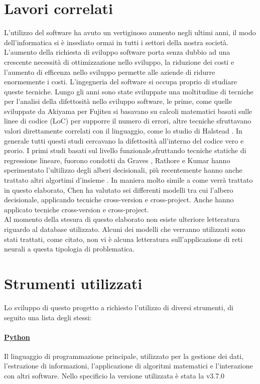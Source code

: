 \documentclass[%
    corpo=12pt,
    twoside,
    oldstyle,
    autoretitolo,
    greek,
    evenboxes,
]{toptesi}
\begin{document}
\section{Lavori correlati}
L'utilizzo del software ha avuto un vertiginoso aumento negli ultimi anni, il modo dell'informatica si è insediato ormai in tutti i settori della nostra società. L'aumento della richiesta di sviluppo software porta senza dubbio ad una crescente necessità di ottimizzazione nello sviluppo, la riduzione dei costi e l'aumento di efficenza nello sviluppo permette alle aziende di ridurre enormemente i costi. L'ingegneria del software si occupa proprio di studiare queste tecniche. Lungo gli anni sono state sviluppate una moltitudine di tecniche per l'analisi della difettosità nello sviluppo software, le prime, come quelle sviluppate da Akiyama per Fujitsu \cite{Akiyama1971AnEO} si basavano su calcoli matematici basati sulle linee di codice (LoC) per supporre il numero di errori, altre tecniche sfruttavano valori direttamente correlati con il linguaggio, come lo studio di Halstead \cite{halstead1977elements}. In generale tutti questi studi cercavano la difettosità all'interno del codice vero e prorio. I primi studi basati sul livello funzionale,sfruttando tecniche statiche di regressione lineare, fuorono condotti da Graves \cite{graves_se}, Rathore e Kumar \cite{santosh_se} hanno sperimentato l'ultilizzo degli alberi decisionali, più recentemente hanno anche trattato altri algortimi d'insieme \cite{rathore}. In maniera molto simile a come verrà trattato in questo elaborato, Chen \cite{Chen} ha valutato sei differenti modelli tra cui l'albero decisionale, applicando tecniche cross-version e cross-project. Anche \cite{super_unsuper} hanno applicato tecniche cross-version e cross-project.\\
Al momento della stesura di questo elaborato non esiste ulteriore letteratura riguardo al database utilizzato. Alcuni dei modelli che verranno utilizzati sono stati trattati, come citato, non vi è alcuna letteratura sull'applicazione di reti neurali a questa tipologia di problematica.

\section{Strumenti utilizzati}
Lo sviluppo di questo progetto a richiesto l'utilizzo di diversi strumenti, di seguito una lista degli stessi:

\paragraph{\href{https://www.python.org/}{Python}} Il linguaggio di programmazione principale, utilizzato per la gestione dei dati, l'estrazione di informazioni, l'applicazione di algoritmi matematici e l'interazione con altri software. Nello specificio la versione utilizzata è stata la v3.7.0
\end{document}
